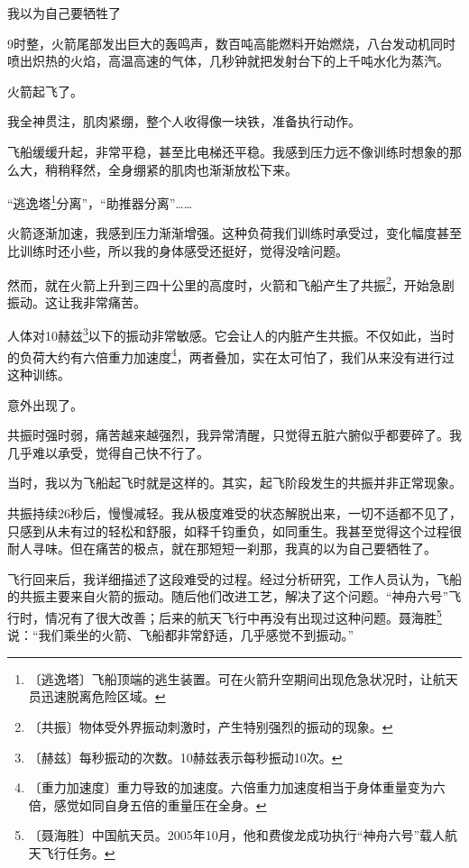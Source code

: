 \documentclass[12pt,UTF-8,openany]{ctexbook}
\begin{document}
\begin{large}
    
    我以为自己要牺牲了
    
    9时整，火箭尾部发出巨大的轰鸣声，数百吨高能燃料开始燃烧，八台发动机同时喷出炽热的火焰，高温高速的气体，几秒钟就把发射台下的上千吨水化为蒸汽。
    
    火箭起飞了。
    
    我全神贯注，肌肉紧绷，整个人收得像一块铁，准备执行动作。
    
    飞船缓缓升起，非常平稳，甚至比电梯还平稳。我感到压力远不像训练时想象的那么大，稍稍释然，全身绷紧的肌肉也渐渐放松下来。
    
    “逃逸塔\footnote{〔逃逸塔〕飞船顶端的逃生装置。可在火箭升空期间出现危急状况时，让航天员迅速脱离危险区域。}分离”，“助推器分离”……
    
    火箭逐渐加速，我感到压力渐渐增强。这种负荷我们训练时承受过，变化幅度甚至比训练时还小些，所以我的身体感受还挺好，觉得没啥问题。
    
    然而，就在火箭上升到三四十公里的高度时，火箭和飞船产生了共振\footnote{〔共振〕物体受外界振动刺激时，产生特别强烈的振动的现象。}，开始急剧振动。这让我非常痛苦。
    
    人体对10赫兹\footnote{〔赫兹〕每秒振动的次数。10赫兹表示每秒振动10次。}以下的振动非常敏感。它会让人的内脏产生共振。不仅如此，当时的负荷大约有六倍重力加速度\footnote{〔重力加速度〕重力导致的加速度。六倍重力加速度相当于身体重量变为六倍，感觉如同自身五倍的重量压在全身。}，两者叠加，实在太可怕了，我们从来没有进行过这种训练。
    
    意外出现了。
    
    共振时强时弱，痛苦越来越强烈，我异常清醒，只觉得五脏六腑似乎都要碎了。我几乎难以承受，觉得自己快不行了。
    
    当时，我以为飞船起飞时就是这样的。其实，起飞阶段发生的共振并非正常现象。
    
    共振持续26秒后，慢慢减轻。我从极度难受的状态解脱出来，一切不适都不见了，只感到从未有过的轻松和舒服，如释千钧重负，如同重生。我甚至觉得这个过程很耐人寻味。但在痛苦的极点，就在那短短一刹那，我真的以为自己要牺牲了。
    
    飞行回来后，我详细描述了这段难受的过程。经过分析研究，工作人员认为，飞船的共振主要来自火箭的振动。随后他们改进工艺，解决了这个问题。“神舟六号”飞行时，情况有了很大改善；后来的航天飞行中再没有出现过这种问题。聂海胜\footnote{〔聂海胜〕中国航天员。2005年10月，他和费俊龙成功执行“神舟六号”载人航天飞行任务。}说：“我们乘坐的火箭、飞船都非常舒适，几乎感觉不到振动。”
    

\end{large}
\end{document}

